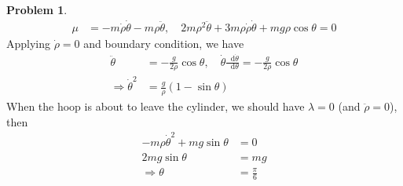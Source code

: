 \documentclass[twoside,11pt]{article}
\newcommand{\lms}{\fontfamily{lmss}\selectfont} %
\renewcommand*\d{\mathop{}\!\mathrm{d}}
\theoremstyle{definition}
\newtheorem{problem}{\lms Problem}
\theoremstyle{remark}
\begin{document}
\begin{problem}
\begin{align*}
    \mu &= -m\dot{\rho}\dot{\theta} - m\rho\ddot{\theta},\quad
    2m\rho^2\ddot{\theta} + 3m\rho\dot{\rho}\dot{\theta} + mg\rho\cos\theta = 0
\end{align*}
Applying $\dot{\rho}=0$ and boundary condition, we have
\begin{align*}
    \ddot{\theta} &= -\frac{g}{2\rho}\cos\theta, \quad
    \dot{\theta}\frac{\d\dot{\theta}}{\d\theta} = -\frac{g}{2\rho}\cos\theta\\
    \Rightarrow\dot{\theta}^2 &= \frac{g}{\rho}(1-\sin\theta)
\end{align*}
When the hoop is about to leave the cylinder, we should have $\lambda=0$ (and $\ddot{\rho}=0$),
then
\begin{align*}
    -m\rho\dot{\theta}^2 + mg\sin\theta &= 0\\
    2mg\sin\theta &= mg\\
    \Rightarrow\theta &= \frac{\pi}{6}
\end{align*}

\end{problem}




\end{document}
